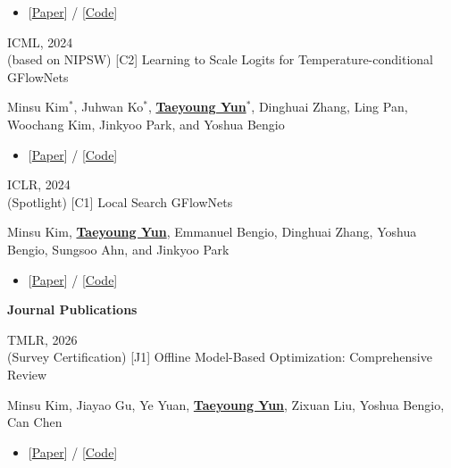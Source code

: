\documentclass[10pt]{developercv} %
\begin{document}
\begin{entrylist}
{        \begin{itemize}[noitemsep,topsep=2pt,parsep=2pt,partopsep=0pt, leftmargin=0pt]
            \item[]{[\href{https://dl.acm.org/doi/abs/10.1145/3637528.3671606}{Paper}] / [\href{https://github.com/dbsxodud-11/offline_meta_bbo}{Code}]}
        \end{itemize}
        }
    \vspace{-3pt}
    \entry
        {ICML, 2024 \\(based on NIPSW)}
        {[C2] Learning to Scale Logits for Temperature-conditional GFlowNets}
        {}
        {Minsu Kim$^{*}$, Juhwan Ko$^{*}$, \underline{\textbf{Taeyoung Yun$^{*}$}}, Dinghuai Zhang, Ling Pan, Woochang Kim, Jinkyoo Park, and Yoshua Bengio
        \begin{itemize}[noitemsep,topsep=2pt,parsep=2pt,partopsep=0pt, leftmargin=0pt]
            \item[]{[\href{https://arxiv.org/abs/2310.02823}{Paper}] / [\href{https://github.com/dbsxodud-11/logit-gfn}{Code}]}
        \end{itemize}
        }
    \vspace{-3pt}
    \entry
        {ICLR, 2024 \\(Spotlight)}
        {[C1] Local Search GFlowNets}
        {}
        {Minsu Kim, \underline{\textbf{Taeyoung Yun}}, Emmanuel Bengio, Dinghuai Zhang, Yoshua Bengio, Sungsoo Ahn, and Jinkyoo Park
        \begin{itemize}[noitemsep,topsep=2pt,parsep=2pt,partopsep=0pt, leftmargin=0pt]
            \item[]{[\href{https://arxiv.org/abs/2310.02710}{Paper}] / [\href{https://github.com/dbsxodud-11/ls_gfn}{Code}]}
        \end{itemize}
        }
\end{entrylist}

\textbf{Journal Publications }
\vspace{8pt}
\begin{entrylist}
    \entry
        {TMLR, 2026 \\(Survey Certification)}
        {[J1] Offline Model-Based Optimization: Comprehensive Review}
        {}
        {Minsu Kim, Jiayao Gu, Ye Yuan, \underline{\textbf{Taeyoung Yun}}, Zixuan Liu, Yoshua Bengio, Can Chen
        \begin{itemize}[noitemsep,topsep=2pt,parsep=2pt,partopsep=0pt, leftmargin=0pt]
            \item[]{[\href{https://arxiv.org/abs/2503.17286v2}{Paper}] / [\href{https://github.com/mila-iqia/Awesome-Offline-Model-Based-Optimization}{Code}]}
        \end{itemize} 
        }
\end{entrylist}
\end{document}
